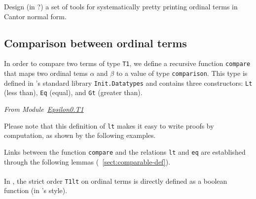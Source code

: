 \begin{project}
Design  (in \ocaml?) a set of tools for systematically pretty printing ordinal terms in Cantor normal form.
\end{project}


\subsection{Comparison between ordinal terms}
\label{sec:orgheadline73}



In order to compare two terms of type \texttt{T1}, we define a recursive function \texttt{compare} that maps two ordinal tems $\alpha$ and $\beta$ to a value of type \texttt{comparison}. This type is defined in \coq's standard library 
\texttt{Init.Datatypes} and
contains three constructors:  \texttt{Lt} (less than), \texttt{Eq} (equal), and
\texttt{Gt} (greater than).


\vspace{4pt}
\emph{From Module~\href{../theories/html/hydras.Epsilon0.T1.html\#compare}{Epsilon0.T1}}




\label{Predicates:lt-T1}
Please note that this definition of \texttt{lt} makes it easy to write proofs by computation, as shown by the following examples.

\vspace{4pt}





Links between the function \texttt{compare} and the relations
\texttt{lt} and \texttt{eq} are established through the following lemmas (~\vref{sect:comparable-def}).
\vspace{4pt}



\paragraph*{\gaiasign}
In \gaia, the strict order \texttt{T1lt} on ordinal terms is directly defined as a boolean function (in \ssreflect's style).


